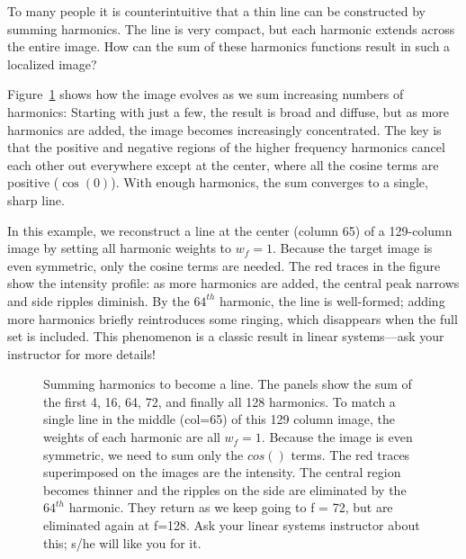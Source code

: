 \documentclass[
  letterpaper,
]{book}
\begin{document}
To many people it is counterintuitive that a thin line can be
constructed by summing harmonics. The line is very compact, but each
harmonic extends across the entire image. How can the sum of these
harmonics functions result in such a localized image?

Figure~\ref{fig-optics-reconstruction} shows how the image evolves as we
sum increasing numbers of harmonics: Starting with just a few, the
result is broad and diffuse, but as more harmonics are added, the image
becomes increasingly concentrated. The key is that the positive and
negative regions of the higher frequency harmonics cancel each other out
everywhere except at the center, where all the cosine terms are positive
(\(\cos(0)\)). With enough harmonics, the sum converges to a single,
sharp line.

In this example, we reconstruct a line at the center (column 65) of a
129-column image by setting all harmonic weights to \(w_f = 1\). Because
the target image is even symmetric, only the cosine terms are needed.
The red traces in the figure show the intensity profile: as more
harmonics are added, the central peak narrows and side ripples diminish.
By the \(64^{th}\) harmonic, the line is well-formed; adding more
harmonics briefly reintroduces some ringing, which disappears when the
full set is included. This phenomenon is a classic result in linear
systems---ask your instructor for more details!

\begin{figure}


\caption{\label{fig-optics-reconstruction}Summing harmonics to become a
line. The panels show the sum of the first 4, 16, 64, 72, and finally
all 128 harmonics. To match a single line in the middle (col=65) of this
129 column image, the weights of each harmonic are all \(w_f = 1\).
Because the image is even symmetric, we need to sum only the \(cos()\)
terms. The red traces superimposed on the images are the intensity. The
central region becomes thinner and the ripples on the side are
eliminated by the \(64^{th}\) harmonic. They return as we keep going to
f = 72, but are eliminated again at f=128. Ask your linear systems
instructor about this; s/he will like you for it.}

\end{figure}%
\end{document}
